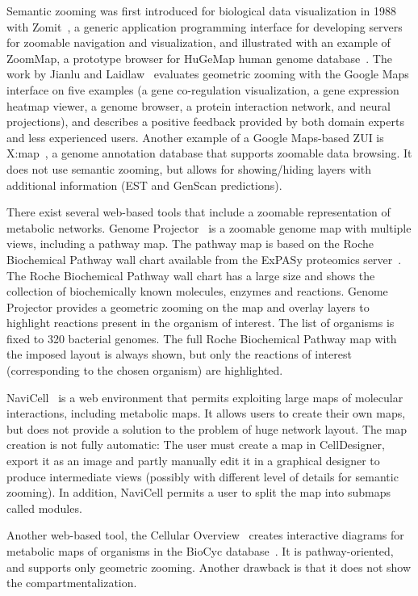 \documentclass{bmcart}
\begin{document}
Semantic zooming was first introduced for biological data visualization in 1988 with Zomit~\cite{Pook1998}, a generic application programming interface for developing  servers for zoomable navigation and visualization, and illustrated with an example of ZoomMap, a prototype browser for HuGeMap human genome database~\cite{Barillot1998}. The work by Jianlu and Laidlaw~\cite{Jianu2013} evaluates geometric zooming with the Google Maps interface on five examples (a gene co-regulation visualization, a gene expression heatmap viewer, a genome browser, a protein interaction network, and  neural projections), and describes a positive feedback provided by both domain experts and less experienced users. Another example of a Google Maps-based ZUI is X:map~\cite{Yates2008}, a genome annotation database that supports zoomable data browsing. It does not use semantic zooming, but allows for showing/hiding layers with additional information (EST and GenScan predictions).

There exist several web-based tools that include a zoomable representation of metabolic networks. Genome Projector~\cite{Arakawa2009} is a zoomable genome map with multiple views, including a pathway map. The pathway map is based on the Roche Biochemical Pathway wall chart available from the ExPASy proteomics server~\cite{Gasteiger2003}. The Roche Biochemical Pathway wall chart has a large size and shows the collection of biochemically known molecules, enzymes and reactions. Genome Projector provides a geometric zooming on the map and overlay layers to highlight reactions present in the organism of interest. The list of organisms is fixed to 320 bacterial genomes. The full Roche Biochemical Pathway map with the imposed layout is always shown, but only the reactions of interest (corresponding to the chosen organism) are highlighted.

NaviCell~\cite{Kuperstein2013} is a web environment that permits exploiting large maps of molecular interactions, including metabolic maps. It allows users to create their own maps, but does not provide a solution to the problem of huge network layout. The map creation is not fully automatic: The user must create a map in CellDesigner, export it as an image and partly manually edit it in a graphical designer to produce intermediate views (possibly with different level of details for semantic zooming). In addition, NaviCell permits a user to split the map into submaps called modules.

Another web-based tool, the Cellular Overview~\cite{Latendresse2011} creates interactive diagrams for metabolic maps of organisms in the BioCyc database~\cite{Caspi2012}. It is pathway-oriented, and supports only geometric zooming. Another drawback is that it does not show the compartmentalization.
\end{document}
